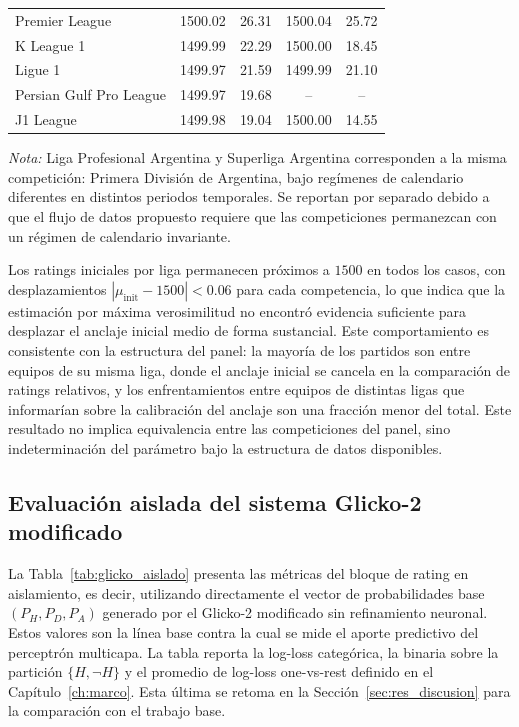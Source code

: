 \begin{table}[htbp]
\begin{tabular}{lcccc}
		Premier League & 1500.02 & 26.31 & 1500.04 & 25.72 \\
		K League 1 & 1499.99 & 22.29 & 1500.00 & 18.45 \\
		Ligue 1 & 1499.97 & 21.59 & 1499.99 & 21.10 \\
		Persian Gulf Pro League & 1499.97 & 19.68 & -- & -- \\
		J1 League & 1499.98 & 19.04 & 1500.00 & 14.55 \\
		\bottomrule
	\end{tabular}
	\begin{flushleft}
		\small \textit{Nota:} Liga Profesional Argentina y Superliga Argentina corresponden a la misma competici\'on: Primera Divisi\'on de Argentina, bajo reg\'imenes de calendario diferentes en distintos periodos temporales. Se reportan por separado debido a que el flujo de datos propuesto requiere que las competiciones permanezcan con un r\'egimen de calendario invariante.
	\end{flushleft}
\end{table}

Los ratings iniciales por liga permanecen pr\'oximos a $1500$ en todos los casos, con desplazamientos $|\mu_\text{init}-1500|<0{.}06$ para cada competencia, lo que indica que la estimaci\'on por m\'axima verosimilitud no encontr\'o evidencia suficiente para desplazar el anclaje inicial medio de forma sustancial. Este comportamiento es consistente con la estructura del panel: la mayor\'ia de los partidos son entre equipos de su misma liga, donde el anclaje inicial se cancela en la comparaci\'on de ratings relativos, y los enfrentamientos entre equipos de distintas ligas que informar\'ian sobre la calibraci\'on del anclaje son una fracci\'on menor del total. Este resultado no implica equivalencia entre las competiciones del panel, sino indeterminaci\'on del par\'ametro bajo la estructura de datos disponibles.

\subsection{Evaluaci\'on aislada del sistema Glicko-2 modificado}
\label{subsec:res_glicko_eval}

La Tabla~\ref{tab:glicko_aislado} presenta las m\'etricas del bloque de rating en aislamiento, es decir, utilizando directamente el vector de probabilidades base $(P_H, P_D, P_A)$ generado por el Glicko-2 modificado sin refinamiento neuronal. Estos valores son la l\'inea base contra la cual se mide el aporte predictivo del perceptr\'on multicapa. La tabla reporta la log-loss categ\'orica, la binaria sobre la partici\'on $\{H, \neg H\}$ y el promedio de log-loss one-vs-rest definido en el Cap\'itulo~\ref{ch:marco}. Esta \'ultima se retoma en la Secci\'on~\ref{sec:res_discusion} para la comparaci\'on con el trabajo base.

